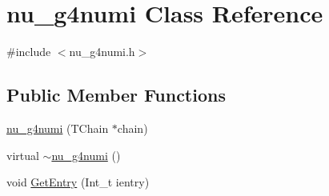 \hypertarget{classnu__g4numi}{\section{nu\-\_\-g4numi Class Reference}
\label{classnu__g4numi}
}


{\ttfamily \#include $<$nu\-\_\-g4numi.\-h$>$}

\subsection*{Public Member Functions}
\begin{DoxyCompactItemize}
\item 
\hyperlink{classnu__g4numi_a5b94600aee440a46d7e7b4010d245a45}{nu\-\_\-g4numi} (T\-Chain $\ast$chain)
\item 
virtual \hyperlink{classnu__g4numi_a185e321ffe9aaf70d66490d2d2abfb37}{$\sim$nu\-\_\-g4numi} ()
\item 
void \hyperlink{classnu__g4numi_ad25cb6d8c5a184c1a626d26f944ef562}{Get\-Entry} (Int\-\_\-t ientry)
\end{DoxyCompactItemize}
